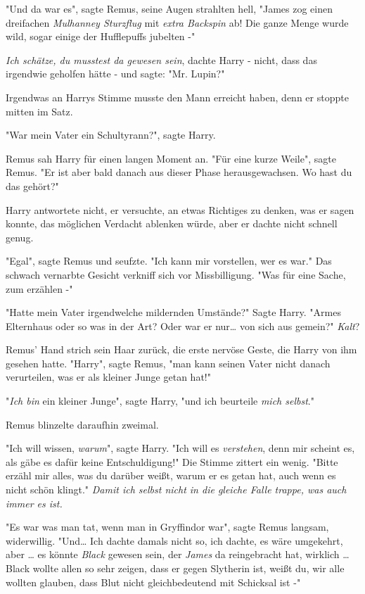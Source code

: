 {"Und da war es", sagte Remus, seine Augen strahlten hell, "James zog einen dreifachen \emph{Mulhanney Sturzflug} mit \emph{extra Backspin} ab! Die ganze Menge wurde wild, sogar einige der Hufflepuffs jubelten -"

\emph{Ich schätze, du musstest da gewesen sein}, dachte Harry - nicht, dass das irgendwie geholfen hätte - und sagte: "Mr. Lupin?"

Irgendwas an Harrys Stimme musste den Mann erreicht haben, denn er stoppte mitten im Satz.

"War mein Vater ein Schultyrann?", sagte Harry.

Remus sah Harry für einen langen Moment an. "Für eine kurze Weile", sagte Remus. "Er ist aber bald danach aus dieser Phase herausgewachsen. Wo hast du das gehört?"

Harry antwortete nicht, er versuchte, an etwas Richtiges zu denken, was er sagen konnte, das möglichen Verdacht ablenken würde, aber er dachte nicht schnell genug.

"Egal", sagte Remus und seufzte. "Ich kann mir vorstellen, wer es war." Das schwach vernarbte Gesicht verkniff sich vor Missbilligung. "Was für eine Sache, zum erzählen -"

"Hatte mein Vater irgendwelche mildernden Umstände?" Sagte Harry. "Armes Elternhaus oder so was in der Art? Oder war er nur… von sich aus gemein?" \emph{Kalt}?

Remus' Hand strich sein Haar zurück, die erste nervöse Geste, die Harry von ihm gesehen hatte. "Harry", sagte Remus, "man kann seinen Vater nicht danach verurteilen, was er als kleiner Junge getan hat!"

"\emph{Ich bin} ein kleiner Junge", sagte Harry, "und ich beurteile \emph{mich selbst}."

Remus blinzelte daraufhin zweimal.

"Ich will wissen, \emph{warum}", sagte Harry. "Ich will es \emph{verstehen}, denn mir scheint es, als gäbe es dafür keine Entschuldigung!" Die Stimme zittert ein wenig. "Bitte erzähl mir alles, was du darüber weißt, warum er es getan hat, auch wenn es nicht schön klingt." \emph{Damit ich selbst nicht in die gleiche Falle trappe, was auch immer es ist.}

"Es war was man tat, wenn man in Gryffindor war", sagte Remus langsam, widerwillig. "Und… Ich dachte damals nicht so, ich dachte, es wäre umgekehrt, aber … es könnte \emph{Black} gewesen sein, der \emph{James} da reingebracht hat, wirklich … Black wollte allen so sehr zeigen, dass er gegen Slytherin ist, weißt du, wir alle wollten glauben, dass Blut nicht gleichbedeutend mit Schicksal ist -"

}
